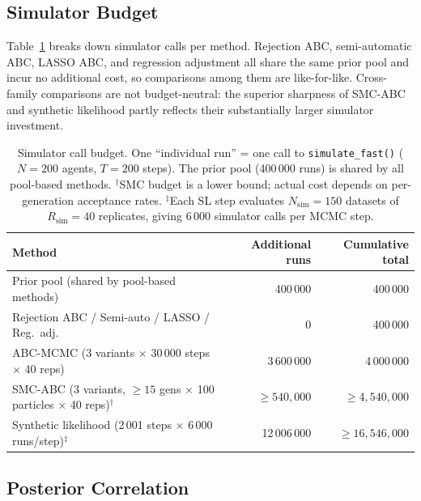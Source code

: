 \documentclass[11pt, a4paper]{article}
\begin{document}
\subsection{Simulator Budget}
\label{sec:budget}

Table~\ref{tab:budget} breaks down simulator calls per method.
Rejection ABC, semi-automatic ABC, LASSO ABC, and regression adjustment all
share the same prior pool and incur no additional cost, so comparisons among
them are like-for-like.
Cross-family comparisons are not budget-neutral: the superior sharpness of
SMC-ABC and synthetic likelihood partly reflects their substantially larger
simulator investment.

\begin{table}[h]
\centering
\caption{Simulator call budget.
         One ``individual run'' = one call to \texttt{simulate\_fast()}
         ($N=200$ agents, $T=200$ steps).
         The prior pool (400\,000 runs) is shared by all pool-based methods.
         $^\dagger$SMC budget is a lower bound; actual cost depends on
         per-generation acceptance rates.
         $^\ddagger$Each SL step evaluates $N_\mathrm{sim}=150$ datasets of
         $R_\mathrm{sim}=40$ replicates, giving 6\,000 simulator calls per
         MCMC step.}
\label{tab:budget}
\begin{tabular}{lrr}
\toprule
Method & Additional runs & Cumulative total \\
\midrule
Prior pool (shared by pool-based methods)        & 400\,000          & 400\,000            \\
Rejection ABC / Semi-auto / LASSO / Reg.\ adj.\  & 0                 & 400\,000            \\
ABC-MCMC (3 variants $\times$ 30\,000 steps $\times$ 40 reps)
                                                 & 3\,600\,000       & 4\,000\,000         \\
SMC-ABC (3 variants, ${\geq}15$ gens $\times$ 100 particles $\times$ 40 reps)$^\dagger$
                                                 & ${\geq}540{,}000$ & ${\geq}4{,}540{,}000$ \\
Synthetic likelihood (2\,001 steps $\times$ 6\,000 runs/step)$^\ddagger$
                                                 & 12\,006\,000      & ${\geq}16{,}546{,}000$ \\
\bottomrule
\end{tabular}
\end{table}

\subsection{Posterior Correlation}
\label{sec:correlation}
\end{document}
